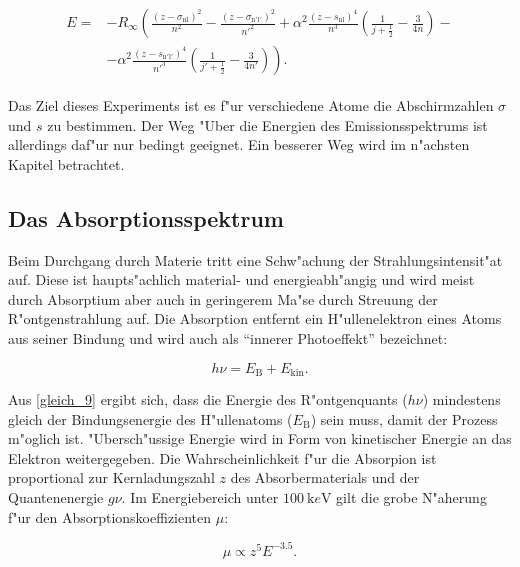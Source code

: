 		\begin{align}
		\begin{split}
			E = & -R_\infty \left( \frac{(z - \sigma_\mathrm{nl})^2}{n^2} - \frac{(z - \sigma_\mathrm{n'l'})^2}{n'^2} +  \alpha^2 \frac{(z - s_\mathrm{nl})^4}{n^3} \left( \frac{1}{j + \frac{1}{2}} - \frac{3}{4n} \right) - \right. \\& \left. - \alpha^2 \frac{(z - s_\mathrm{n'l'})^4}{n'^3} \left( \frac{1}{j' + \frac{1}{2}} - \frac{3}{4n'} \right) \right) . \label{gleich_8}
		\end{split}
		\end{align}

		Das Ziel dieses Experiments ist es f"ur verschiedene Atome die Abschirmzahlen $\sigma$ und $s$ zu bestimmen.
		Der Weg "Uber die Energien des Emissionsspektrums ist allerdings daf"ur nur bedingt geeignet.
		Ein besserer Weg wird im n"achsten Kapitel betrachtet.

	\subsection{Das Absorptionsspektrum}
	\label{sub:das_absorptionsspektrum}
	
		Beim Durchgang durch Materie tritt eine Schw"achung der Strahlungsintensit"at auf.
		Diese ist haupts"achlich material- und energieabh"angig und wird meist durch Absorptium aber auch in geringerem Ma"se durch Streuung der R"ontgenstrahlung auf. 
		Die Absorption entfernt ein H"ullenelektron eines Atoms aus seiner Bindung und wird auch als "`innerer Photoeffekt"' bezeichnet:

		\begin{equation}
			h\nu = E_\mathrm{B} + E_\mathrm{kin}. \label{gleich_9}
		\end{equation}

		Aus \eqref{gleich_9} ergibt sich, dass die Energie des R"ontgenquants ($h\nu$) mindestens gleich der Bin\-dungs\-en\-er\-gie des H"ullenatoms ($E_\mathrm{B}$) sein muss, damit der Prozess m"oglich ist.
		"Ubersch"ussige Energie wird in Form von kinetischer Energie an das Elektron weitergegeben.
		Die Wahr\-schein\-lich\-keit f"ur die Absorpion ist proportional zur Kernladungszahl $z$ des Absorbermaterials und der Quantenenergie $g\nu$.
		Im Energiebereich unter $\SI{100}{\kilo e \volt}$ gilt die grobe N"aherung f"ur den Absorptionskoeffizienten $\mu$:
		
		\begin{equation}
			\mu \propto z^5 E^{-3.5}. \label{gleich_10}
		\end{equation}

